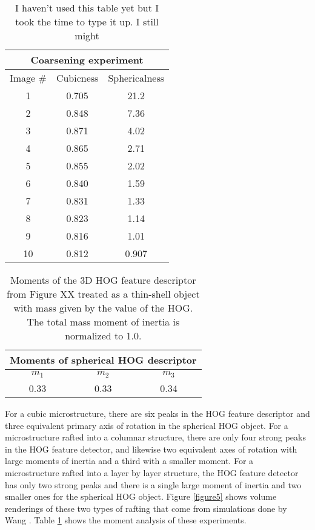 \documentclass[review]{elsarticle}
\begin{document}
    \begin{table}[h]
      \begin{center}
      \begin{tabular}{ c | c | c }
        \multicolumn{3}{c}{Coarsening experiment} \\
        \hline
        Image \# & Cubicness & Sphericalness \\
        \hline
        1 & 0.705 & 21.2 \\
        2 & 0.848 & 7.36 \\
        3 & 0.871 & 4.02 \\
        4 & 0.865 & 2.71 \\
        5 & 0.855 & 2.02 \\
        6 & 0.840 & 1.59 \\
        7 & 0.831 & 1.33 \\
        8 & 0.823 & 1.14 \\
        9 & 0.816 & 1.01 \\
        10 & 0.812 & 0.907 \\
        \hline
      \end{tabular}
	  \label{table3}
	  \caption{I haven't used this table yet but I took the time to type it up. I still might }
	  \end{center}
  	\end{table}

    
    \begin{table}[h]
      \begin{center}
      \begin{tabular}{ c | c | c }
        \multicolumn{3}{c}{Moments of spherical HOG descriptor} \\
        \hline
        $m_1$ & $m_2$ & $m_3$ \\
        \hline
        0.33 & 0.33 & 0.34 \\
        \hline
      \end{tabular}
	  \label{table4}
	  \caption{ Moments of the 3D HOG feature descriptor from Figure XX treated as a thin-shell object with mass given by the value of the HOG. The total mass moment of inertia is normalized to 1.0. }
	  \end{center}
  	\end{table}
	
	For a cubic microstructure, there are six peaks in the HOG feature descriptor and three equivalent primary axis of rotation in the spherical HOG object. For a microstructure rafted into a columnar structure, there are only four strong peaks in the HOG feature detector, and likewise two equivalent axes of rotation with large moments of inertia and a third with a smaller moment. For a microstructure rafted into a layer by layer structure, the HOG feature detector has only two strong peaks and there is a single large moment of inertia and two smaller ones for the spherical HOG object. Figure \ref{figure5} shows volume renderings of these two types of rafting that come from simulations done by Wang \cite{ywang2}. Table \ref{table3} shows the moment analysis of these experiments.
	
\end{document}
